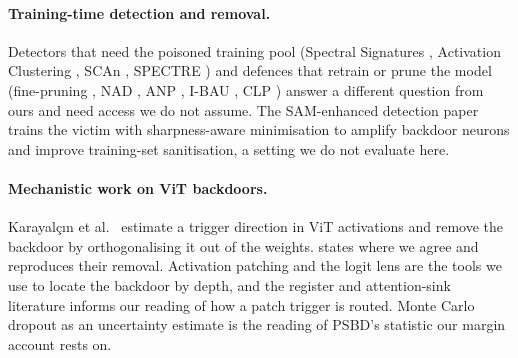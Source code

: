 \paragraph{Training-time detection and removal.}
Detectors that need the poisoned training pool (Spectral Signatures \cite{tran2018spectral}, Activation Clustering \cite{chen2018activation}, SCAn \cite{tang2021demon}, SPECTRE \cite{hayase2021spectre}) and defences that retrain or prune the model (fine-pruning \cite{liu2018finepruning}, NAD \cite{li2021nad}, ANP \cite{wu2021anp}, I-BAU \cite{zeng2022ibau}, CLP \cite{zheng2022clp}) answer a different question from ours and need access we do not assume. The SAM-enhanced detection paper \cite{zhang2024samdetection} trains the victim with sharpness-aware minimisation to amplify backdoor neurons and improve training-set sanitisation, a setting we do not evaluate here.

\paragraph{Mechanistic work on ViT backdoors.}
Karayal\c{c}{\i}n et al.~\cite{karayalcin2026backdoor} estimate a trigger direction in ViT activations and remove the backdoor by orthogonalising it out of the weights.  states where we agree and reproduces their removal. Activation patching \cite{zhang2024patching} and the logit lens \cite{nostalgebraist2020logitlens,belrose2023tunedlens} are the tools we use to locate the backdoor by depth, and the register and attention-sink literature \cite{darcet2024registers,sun2024massive} informs our reading of how a patch trigger is routed. Monte Carlo dropout as an uncertainty estimate \cite{gal2016dropout} is the reading of PSBD's statistic our margin account rests on.
